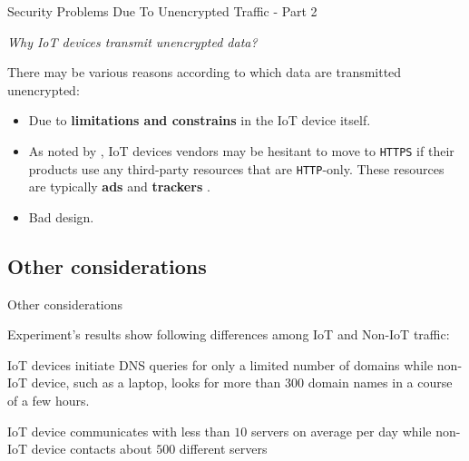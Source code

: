 \documentclass[10pt]{beamer}
\begin{document}
\begin{frame}{Security Problems Due To Unencrypted Traffic - Part 2}

\begin{alertblock}{}
\textit{Why IoT devices transmit unencrypted data?}
\end{alertblock}

There may be various reasons according to which data are transmitted unencrypted:

\begin{itemize}
\justifying

\item Due to \textbf{limitations and constrains} in the IoT device itself. 

\item As noted by \citet{mazhar2020characterizing}, IoT devices vendors may be hesitant to move to \texttt{HTTPS} if their products use any third-party resources that are \texttt{HTTP}-only. These resources are typically \textbf{ads} and \textbf{trackers} \cite{mazhar2020characterizing}.

\item Bad design.

\end{itemize}


\end{frame} 

\subsection{Other considerations}
\begin{frame}{Other considerations}

Experiment's results show following differences among IoT and Non-IoT traffic:

\begin{description}
\justifying
\item[DNS trafﬁc] IoT devices initiate DNS queries for only a limited number of domains while non-IoT device, such as a laptop, looks for more than $300$ domain names in a course of a few hours.

\item[Number of Cloud servers] IoT device communicates with less than $10$ servers on average per day while non-IoT device contacts about $500$ different servers
\end{description}

\end{frame} 
\end{document}
